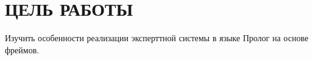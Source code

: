 \section{ЦЕЛЬ РАБОТЫ}

Изучить особенности реализации эксперттной системы в языке Пролог на основе фреймов.